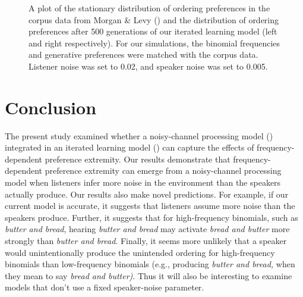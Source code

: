 \documentclass[
  12pt,
  letterpaper,
]{scrreprt}
\begin{document}
\begin{figure}[htbp]

\caption{\label{fig-corpusourmodel}A plot of the stationary distribution
of ordering preferences in the corpus data from Morgan \& Levy
() and the distribution of ordering
preferences after 500 generations of our iterated learning model (left
and right respectively). For our simulations, the binomial frequencies
and generative preferences were matched with the corpus data. Listener
noise was set to 0.02, and speaker noise was set to 0.005.}


\end{figure}%

\section{Conclusion}\label{conclusion-3}

The present study examined whether a noisy-channel processing model
() integrated in an iterated learning model
() can capture the effects of frequency-dependent
preference extremity. Our results demonstrate that frequency-dependent
preference extremity can emerge from a noisy-channel processing model
when listeners infer more noise in the environment than the speakers
actually produce. Our results also make novel predictions. For example,
if our current model is accurate, it suggests that listeners assume more
noise than the speakers produce. Further, it suggests that for
high-frequency binomials, such as \emph{butter and bread}, hearing
\emph{butter and bread} may activate \emph{bread and butter} more
strongly than \emph{butter and bread}. Finally, it seems more unlikely
that a speaker would unintentionally produce the unintended ordering for
high-frequency binomials than low-frequency binomials (e.g., producing
\emph{butter and bread,} when they mean to say \emph{bread and butter)}.
Thus it will also be interesting to examine models that don't use a
fixed speaker-noise parameter.
\end{document}
